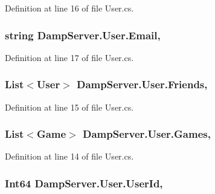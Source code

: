 Definition at line 16 of file User.\-cs.

\hypertarget{class_damp_server_1_1_user_ab5bdc989d5254cfa42fd348f6d618642}{
\subsubsection[{Email}]{\setlength{\rightskip}{0pt plus 5cm}string Damp\-Server.\-User.\-Email\hspace{0.3cm}{\ttfamily [get]}, {\ttfamily [set]}}}\label{class_damp_server_1_1_user_ab5bdc989d5254cfa42fd348f6d618642}


Definition at line 17 of file User.\-cs.

\hypertarget{class_damp_server_1_1_user_a73ec7514f54e351940510340479a89d7}{
\subsubsection[{Friends}]{\setlength{\rightskip}{0pt plus 5cm}List$<${\bf User}$>$ Damp\-Server.\-User.\-Friends\hspace{0.3cm}{\ttfamily [get]}, {\ttfamily [set]}}}\label{class_damp_server_1_1_user_a73ec7514f54e351940510340479a89d7}


Definition at line 15 of file User.\-cs.

\hypertarget{class_damp_server_1_1_user_add091c76528355d15a75d6c08d1db2b5}{
\subsubsection[{Games}]{\setlength{\rightskip}{0pt plus 5cm}List$<${\bf Game}$>$ Damp\-Server.\-User.\-Games\hspace{0.3cm}{\ttfamily [get]}, {\ttfamily [set]}}}\label{class_damp_server_1_1_user_add091c76528355d15a75d6c08d1db2b5}


Definition at line 14 of file User.\-cs.

\hypertarget{class_damp_server_1_1_user_a96e7806d1b61c328ec1cdb0b98ace8f5}{
\subsubsection[{User\-Id}]{\setlength{\rightskip}{0pt plus 5cm}Int64 Damp\-Server.\-User.\-User\-Id\hspace{0.3cm}{\ttfamily [get]}, {\ttfamily [set]}}}\label{class_damp_server_1_1_user_a96e7806d1b61c328ec1cdb0b98ace8f5}


